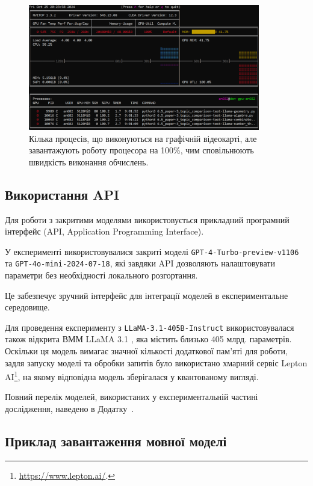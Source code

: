 \begin{figure}
    \centering
    \includegraphics[width=0.9\textwidth]{data/gpu_util.pdf}
    \caption{Кілька процесів, що виконуються на графічній відеокарті, але завантажують роботу процесора на 100\%, чим сповільнюють швидкість виконання обчислень.}
    \label{fig:gpu_util}
\end{figure}

\subsection{Використання API}

Для роботи з закритими моделями використовується прикладний програмний інтерфейс (API, Application Programming Interface).

У експерименті використовувалися закриті моделі \texttt{GPT-4-Turbo-preview-v1106} та \texttt{GPT-4o-mini-2024-07-18}, які завдяки API дозволяють налаштовувати параметри без необхідності локального розгортання. 

Це забезпечує зручний інтерфейс для інтеграції моделей в експериментальне середовище.

Для проведення експерименту з \texttt{LLaMA-3.1-405B-Instruct} використовувалася також відкрита ВММ LLaMA 3.1 \cite{grattafiori2024llama3herdmodels}, яка містить близько 405 млрд. параметрів. Оскільки ця модель вимагає значної кількості додаткової пам’яті для роботи, задля запуску моделі та обробки запитів було використано хмарний сервіс Lepton AI\footnote{\url{https://www.lepton.ai/}.}, на якому відповідна модель зберігалася у квантованому вигляді.

Повний перелік моделей, використаних у експериментальній частині дослідження, наведено в Додатку~.

\subsection{Приклад завантаження мовної моделі}

